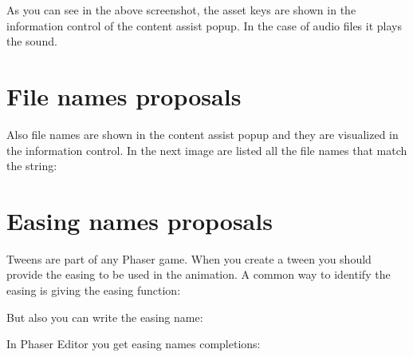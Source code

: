 \documentclass[letterpaper,10pt,english]{sphinxmanual}
\begin{document}
\noindent{}

As you can see in the above screenshot, the asset keys are shown in the information control of the content assist popup. In the case of audio files it plays the sound.


\section{File names proposals}
\label{\detokenize{jseditor:file-names-proposals}}
Also file names are shown in the content assist popup and they are visualized in the information control. In the next image are listed all the file names that match the  string:

\noindent{}


\section{Easing names proposals}
\label{\detokenize{jseditor:easing-names-proposals}}
Tweens are part of any Phaser game. When you create a tween you should provide the easing to be used in the animation. A common way to identify the easing is giving the easing function:

\begin{sphinxVerbatim}[commandchars=\\\{\}]
   
\end{sphinxVerbatim}

But also you can write the easing name:

\begin{sphinxVerbatim}[commandchars=\\\{\}]
   
\end{sphinxVerbatim}

In Phaser Editor you get easing names completions:
\end{document}
